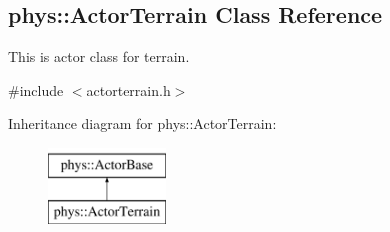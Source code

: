 \hypertarget{classphys_1_1ActorTerrain}{
\subsection{phys::ActorTerrain Class Reference}
\label{classphys_1_1ActorTerrain}
}


This is actor class for terrain.  




{\ttfamily \#include $<$actorterrain.h$>$}

Inheritance diagram for phys::ActorTerrain:\begin{figure}[H]
\begin{center}
\leavevmode
\includegraphics[height=2.000000cm]{classphys_1_1ActorTerrain}
\end{center}
\end{figure}
